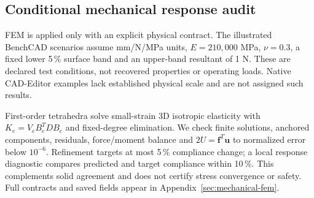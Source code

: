 \subsection{Conditional mechanical response audit}
FEM is applied only with an explicit physical contract. The illustrated BenchCAD scenarios assume mm/N/MPa units, $E=210{,}000$ MPa, $\nu=0.3$, a fixed lower 5\,\% surface band and an upper-band resultant of 1 N. These are declared test conditions, not recovered properties or operating loads. Native CAD-Editor examples lack established physical scale and are not assigned such results.

First-order tetrahedra solve small-strain 3D isotropic elasticity with $K_e=V_eB_e^TDB_e$ and fixed-degree elimination. We check finite solutions, anchored components, residuals, force/moment balance and $2U=\mathbf f^T\mathbf u$ to normalized error below $10^{-6}$. Refinement targets at most 5\,\% compliance change; a local response diagnostic compares predicted and target compliance within 10\,\%. This complements solid agreement and does not certify stress convergence or safety. Full contracts and saved fields appear in Appendix~\ref{sec:mechanical-fem}.
